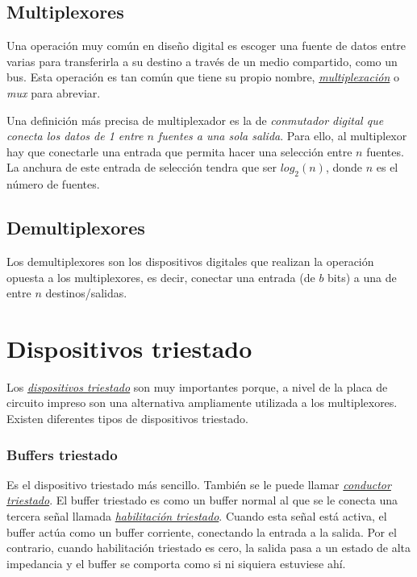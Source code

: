 \begin{itemize}
\subsection{Multiplexores}
Una operación muy común en diseño digital es escoger una fuente de datos entre varias para transferirla a su destino a través de un medio compartido, como un bus. Esta operación es tan común que tiene su propio nombre, \hyperlink{multiplexing}{\emph{multiplexación}} o \emph{mux} para abreviar.

Una definición más precisa de multiplexador es la de \textit{conmutador digital que conecta los datos de 1 entre $n$ fuentes a una sola salida}. Para ello, al multiplexor hay que conectarle una entrada que permita hacer una selección entre $n$ fuentes. La anchura de este entrada de selección tendra que ser $log_2(n)$, donde $n$ es el número de fuentes.



\subsection{Demultiplexores}
Los demultiplexores son los dispositivos digitales que realizan la operación opuesta a los multiplexores, es decir, conectar una entrada (de $b$ bits) a una de entre $n$ destinos/salidas.
\end{itemize}

\section{Dispositivos triestado}
Los \hyperlink{threestate_device}{\emph{dispositivos triestado}} son muy importantes porque, a nivel de la placa de circuito impreso son una alternativa ampliamente utilizada a los multiplexores. Existen diferentes tipos de dispositivos triestado.

\subsubsection{Buffers triestado}
Es el dispositivo triestado más sencillo. También se le puede llamar \hyperlink{threestate_driver}{\emph{conductor triestado}}. El buffer triestado es como un buffer normal al que se le conecta una tercera señal llamada \hyperlink{threestate_enable}{\emph{habilitación triestado}}. Cuando esta señal está activa, el buffer actúa como un buffer corriente, conectando la entrada a la salida. Por el contrario, cuando habilitación triestado es cero, la salida pasa a un estado de alta impedancia y el buffer se comporta como si ni siquiera estuviese ahí. 

